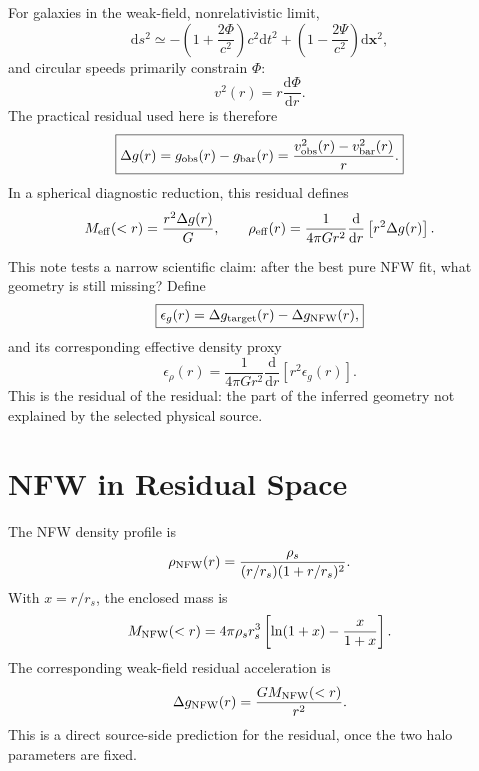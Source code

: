 \documentclass[10pt]{article}
\newcommand{\dd}{\mathrm{d}}
\begin{document}
For galaxies in the weak-field, nonrelativistic limit,
\begin{equation}
\dd s^2
\simeq
-\left(1+\frac{2\Phi}{c^2}\right)c^2\dd t^2
+
\left(1-\frac{2\Psi}{c^2}\right)\dd\mathbf{x}^2,
\end{equation}
and circular speeds primarily constrain $\Phi$:
\begin{equation}
v^2(r)=r\frac{\dd\Phi}{\dd r}.
\end{equation}
The practical residual used here is therefore
\begin{equation}
\boxed{
\Delta g(r)
=
g_{\rm obs}(r)-g_{\rm bar}(r)
=
\frac{v_{\rm obs}^2(r)-v_{\rm bar}^2(r)}{r}.
}
\end{equation}
In a spherical diagnostic reduction, this residual defines
\begin{equation}
M_{\rm eff}(<r)
=
\frac{r^2\Delta g(r)}{G},
\qquad
\rho_{\rm eff}(r)
=
\frac{1}{4\pi G r^2}
\frac{\dd}{\dd r}
\left[
r^2\Delta g(r)
\right].
\end{equation}

This note tests a narrow scientific claim: after the best pure NFW fit, what
geometry is still missing? Define
\begin{equation}
\boxed{
\epsilon_g(r)
=
\Delta g_{\rm target}(r)
-
\Delta g_{\rm NFW}(r),
}
\end{equation}
and its corresponding effective density proxy
\begin{equation}
\boxed{
\epsilon_\rho(r)
=
\frac{1}{4\pi G r^2}
\frac{\dd}{\dd r}
\left[
r^2\epsilon_g(r)
\right].
}
\end{equation}
This is the residual of the residual: the part of the inferred geometry not
explained by the selected physical source.

\section{NFW in Residual Space}

The NFW density profile \citep{Navarro1996} is
\begin{equation}
\rho_{\rm NFW}(r)
=
\frac{\rho_s}{(r/r_s)(1+r/r_s)^2}.
\end{equation}
With $x=r/r_s$, the enclosed mass is
\begin{equation}
M_{\rm NFW}(<r)
=
4\pi \rho_s r_s^3
\left[
\ln(1+x)-\frac{x}{1+x}
\right].
\end{equation}
The corresponding weak-field residual acceleration is
\begin{equation}
\Delta g_{\rm NFW}(r)
=
\frac{G M_{\rm NFW}(<r)}{r^2}.
\end{equation}
This is a direct source-side prediction for the residual, once the two halo
parameters are fixed.
\end{document}
